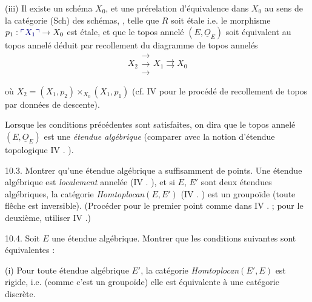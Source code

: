 \documentclass[11pt,a4paper]{article}
\begin{document}
(iii) Il existe un schéma $X_0$, et une prérelation d'équivalence 
dans $X_0$ au sens de la catégorie (Sch) des schémas, \struck{\ill{}}, telle
que $R$ soit étale i.e. le morphisme $p_1 : \add{X_1} \to X_0$ est étale, et que
le topos annelé $(E, \underline{O}_E)$ soit équivalent au topos annelé déduit
par recollement du diagramme  de topos
annelés 
\[
X_2 \mathrel{\substack{\longrightarrow\\[-2pt] \longrightarrow\\[-2pt]
\longrightarrow}} X_1 \rightrightarrows X_0
\]



où $X_2 = (X_1, p_2) \times_{X_0} (X_1, p_1)$ (cf. IV  \quad pour le
procédé de recollement de topos par données de descente).

Lorsque les conditions précédentes sont satisfaites, on dira que le topos
annelé $(E, \underline{O}_E)$ est une \emph{étendue algébrique} (comparer avec
la notion d'étendue topologique IV . \quad).

10.3. \quad Montrer qu'une étendue algébrique a suffisamment de points. Une
étendue algébrique est \emph{localement} annelée (IV . \quad), et si
$E$, $E'$ sont deux étendues algébriques, la catégorie
\emph{Homtoplocan}$(E, E')$ (IV . \quad) est un groupoïde (toute
flêche est inversible). (Procéder pour le premier point comme dans IV .
\quad ; pour le deuxième, utiliser IV \quad .)

10.4. \quad {} Soit $E$ une étendue algébrique.
Montrer que les conditions suivantes sont équivalentes :

(i) Pour toute étendue algébrique $E'$, la catégorie
\emph{Homtoplocan}$(E', E)$ est rigide, i.e. (comme c'est un groupoïde) elle
est équivalente à une catégorie discrète.
\end{document}
